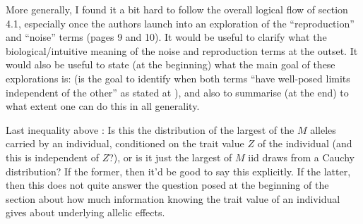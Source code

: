 
\begin{point}{}
More generally, I found it a bit hard to follow the overall logical flow of section 4.1, especially once the authors launch into an exploration of the ``reproduction'' and ``noise'' terms (pages 9 and 10).
    It would be useful to clarify what the biological/intuitive meaning of the noise and reproduction terms at the outset. It would also be useful to state (at the beginning) what the main goal of these explorations is: (is the goal to identify when both terms ``have well-posed limits independent of the other'' as stated at ), and also to summarise (at the end) to what extent one can do this in all generality.
\end{point}



\begin{point}{}
    Last inequality above \revref: Is this the distribution of the largest of the $M$ alleles carried by an individual, conditioned on the trait value $Z$ of the individual (and this is independent of $Z$?), or is it just the largest of $M$ iid draws from a Cauchy distribution? If the former, then it'd be good to say this explicitly. If the latter, then this does not quite answer the question posed at the beginning of the section about how much information knowing the trait value of an individual gives about underlying allelic effects.
\end{point}

